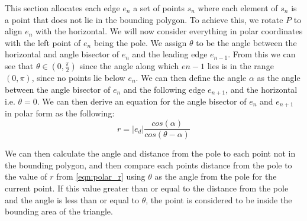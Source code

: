 \documentclass[11pt]{article}
\begin{document}
This section allocates each edge $e_n$ a set of points $s_n$ where each element of $s_n$ is a point that does not lie in the bounding polygon. To achieve this, we rotate $P$ to align $e_n$ with the horizontal. We will now consider everything in polar coordinates with the left point of $e_n$ being the pole. We assign $\theta$ to be the angle between the horizontal and angle bisector of $e_n$ and the leading edge $e_{n-1}$. From this we can see that $\theta\in(0,\frac{\pi}{2})$ since the angle along which $e{n-1}$ lies is in the range $(0,\pi)$, since no points lie below $e_n$. We can then define the angle $\alpha$ as the angle between the angle bisector of $e_n$ and the following edge $e_{n+1}$, and the horizontal i.e. $\theta=0$. We can then derive an equation for the angle bisector of $e_n$ and $e_{n+1}$ in polar form as the following:
\begin{equation}
	r=|e_d|\frac{cos(\alpha)}{cos(\theta-\alpha)}
	\label{eqn:polar_r}
\end{equation}

We can then calculate the angle and distance from the pole to each point not in the bounding polygon, and then compare each points distance from the pole to the value of $r$ from \cref{eqn:polar_r} using $\theta$ as the angle from the pole for the current point. If this value greater than or equal to the distance from the pole and the angle is less than or equal to $\theta$, the point is considered to be inside the bounding area of the triangle.
\end{document}
